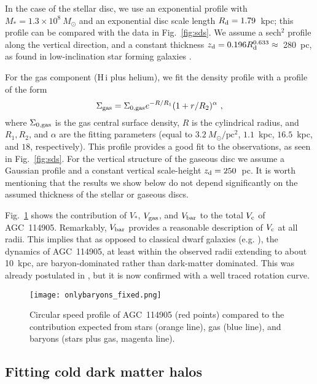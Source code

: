 \documentclass[fleqn,usenatbib]{mnras}
\begin{document}
In the case of the stellar disc, we use an exponential profile with $M_\ast = 1.3\times10^8~M_\odot$ and an exponential disc scale length $R_{\rm d} = 1.79$~kpc; this profile can be compared with the data in Fig.~\ref{fig:sds}. We assume a sech$^2$ profile along the vertical direction, and a constant thickness $z_{\rm d} = 0.196 R_{\rm d}^{0.633} \approx$~280~pc, as found in low-inclination star forming galaxies \citep{bershady_thickness}.

For the gas component (H\,{\sc i} plus helium), we fit the density profile with a profile of the form
\begin{equation}
    \Sigma_{\rm gas} = \Sigma_{\rm 0, gas} e^{-R/R_1} (1+r/R_2)^\alpha~,
\end{equation}
where $\Sigma_{\rm 0,gas}$ is the gas central surface density, $R$ is the cylindrical radius, and $R_1, R_2$, and $\alpha$ are the fitting parameters (equal to $3.2~M_\odot/\textrm{pc}^2$, $1.1$~kpc, $16.5$~kpc, and $18$, respectively). This profile provides a good fit to the observations, as seen in Fig.~\ref{fig:sds}. For the vertical structure of the gaseous disc we assume a Gaussian profile and a constant vertical scale-height $z_{\rm d} = 250$~pc. It is worth mentioning that the results we show below do not depend significantly on the assumed thickness of the stellar or gaseous discs.

Fig.~\ref{fig:baryondominated} shows the contribution of $V_{\ast}$, $V_{\rm gas}$, and $V_{\rm bar}$ to the total $V_{\rm c}$ of AGC~114905. Remarkably, $V_{\rm bar}$ provides a reasonable description of $V_{\rm c}$ at all radii. This implies that as opposed to classical dwarf galaxies (e.g. \citealt{iorio,read2017}), the dynamics of AGC~114905, at least within the observed radii extending to about 10~kpc, are baryon-dominated rather than dark-matter dominated. This was already postulated in \citet{huds2019}, but it is now confirmed with a well traced rotation curve.

\begin{figure}
    \centering
    \texttt{[image: onlybaryons\_fixed.png]}
    \caption{Circular speed profile of AGC~114905 (red points) compared to the contribution expected from stars (orange line), gas (blue line), and baryons (stars plus gas, magenta line).}
    \label{fig:baryondominated}
\end{figure}



\subsection{Fitting cold dark matter halos}
\end{document}

